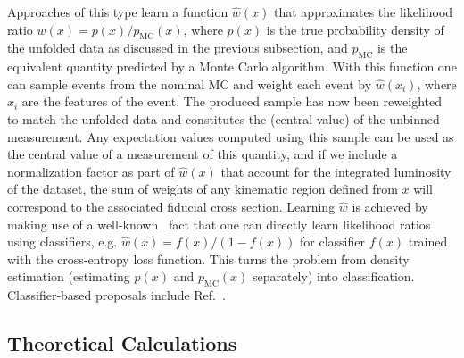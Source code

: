 \documentclass[a4paper,11pt]{article}
\begin{document}
Approaches of this type learn a function $\hat{w}(x)$ that approximates the likelihood ratio $w(x)= p(x)/p_\text{MC}(x)$, where $p(x)$ is the true probability density of the unfolded data as discussed in the previous subsection, and $p_\text{MC}$ is the equivalent quantity predicted by a Monte Carlo algorithm. With this function one can sample events from the nominal MC and weight each event by $\hat{w}(x_i)$, where $x_i$ are the features of the event.  The produced sample has now been reweighted to match the unfolded data and constitutes the (central value) of the unbinned measurement.
Any expectation values computed using this sample can be used as the central value of a measurement of this quantity, and if we include a normalization factor as part of $\hat{w}(x)$ that account for the integrated luminosity of the dataset, the sum of weights of any kinematic region defined from $x$ will correspond to the associated fiducial cross section. Learning $\hat{w}$ is achieved by making use of a well-known~\cite{hastie01statisticallearning,sugiyama_suzuki_kanamori_2012} fact that one can directly learn likelihood ratios using classifiers, e.g. $\hat{w}(x)=f(x)/(1-f(x))$ for classifier $f(x)$ trained with the cross-entropy loss function.  This turns the problem from density estimation (estimating $p(x)$ and $p_\text{MC}(x)$ separately) into classification.   Classifier-based proposals include Ref.~\cite{Andreassen:2019cjw,Andreassen:2021zzk,bunse2018unification,Ruhe2019MiningFS}.

\subsection{Theoretical Calculations}
\end{document}
